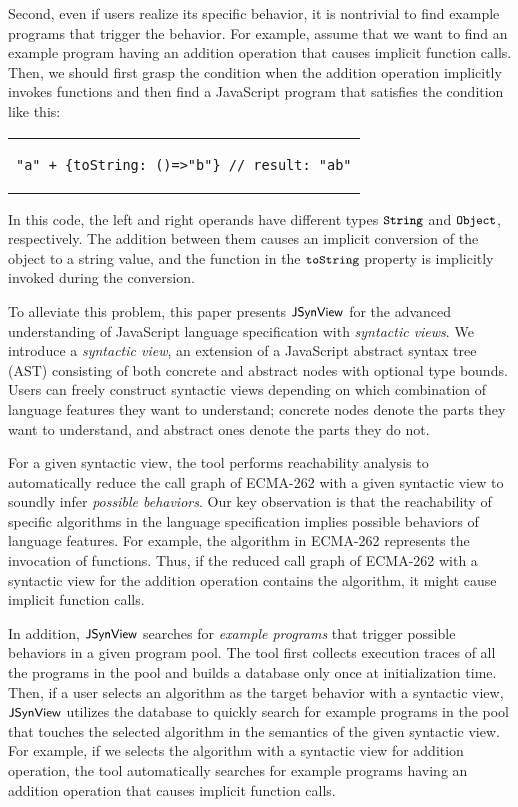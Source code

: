 Second, even if users realize its specific behavior, it is nontrivial to find
example programs that trigger the behavior.  For example, assume that we want to
find an example program having an addition operation that causes implicit
function calls.  Then, we should first grasp the condition when the addition
operation implicitly invokes functions and then find a JavaScript program that
satisfies the condition like this:
\begin{center}
  \begin{tabular}{c}
    \begin{lstlisting}[style=JS]
"a" + {toString: ()=>"b"} // result: "ab"
    \end{lstlisting}
  \end{tabular}
\end{center}
In this code, the left and right operands have different types ${\small \texttt{String}}$
and ${\small \texttt{Object}}$, respectively.  The addition between them causes an
implicit conversion of the object to a string value, and the function in the
${\small \texttt{toString}}$ property is implicitly invoked during the conversion.

To alleviate this problem, this paper presents $\textsf{\small JSynView}$ for the advanced
understanding of JavaScript language specification with \textit{syntactic
views}.  We introduce a \textit{syntactic view}, an extension of a JavaScript
abstract syntax tree (AST) consisting of both concrete and abstract nodes with
optional type bounds.  Users can freely construct syntactic views depending on
which combination of language features they want to understand; concrete nodes
denote the parts they want to understand, and abstract ones denote the parts
they do not.

For a given syntactic view, the tool performs reachability analysis to
automatically reduce the call graph of ECMA-262 with a given syntactic view to
soundly infer \textit{possible behaviors}.  Our key observation is that the
reachability of specific algorithms in the language specification implies
possible behaviors of language features.  For example, the 
algorithm in ECMA-262 represents the invocation of functions.  Thus, if the
reduced call graph of ECMA-262 with a syntactic view for the addition operation
contains the  algorithm, it might cause implicit function calls.

In addition, $\textsf{\small JSynView}$ searches for \textit{example programs} that trigger
possible behaviors in a given program pool.  The tool first collects execution
traces of all the programs in the pool and builds a database only once at
initialization time.  Then, if a user selects an algorithm as the target
behavior with a syntactic view, $\textsf{\small JSynView}$ utilizes the database to quickly search for
example programs in the pool that touches the selected algorithm in the
semantics of the given syntactic view.  For example, if we selects the
 algorithm with a syntactic view for addition operation, the tool
automatically searches for example programs having an addition operation that
causes implicit function calls.

